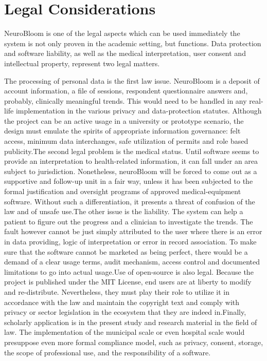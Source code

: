 \documentclass[12pt,a4paper]{report}
\begin{document}
\section{Legal Considerations}
NeuroBloom is one of the legal aspects which can be used immediately the system is not only proven in the academic setting, but functions. Data protection and software liability, as well as the medical interpretation, user consent and intellectual property, represent two legal matters.

The processing of personal data is the first law issue. NeuroBloom is a deposit of account information, a file of sessions, respondent questionnaire answers and, probably, clinically meaningful trends. This would need to be handled in any real-life implementation in the various privacy and data-protection statutes. Although the project can be an active usage in a university or prototype scenario, the design must emulate the spirits of appropriate information governance: felt access, minimum data interchanges, safe utilization of permits and role based publicity.The second legal problem is the medical status. Until software seems to provide an interpretation to health-related information, it can fall under an area subject to jurisdiction. Nonetheless, neuroBloom will be forced to come out as a supportive and follow-up unit in a fair way, unless it has been subjected to the formal justification and oversight programs of approved medical-equipment software. Without such a differentiation, it presents a threat of confusion of the law and of unsafe use.The other issue is the liability. The system can help a patient to figure out the progress and a clinician to investigate the trends. The fault however cannot be just simply attributed to the user where there is an error in data providing, logic of interpretation or error in record association. To make sure that the software cannot be marketed as being perfect, there would be a demand of a clear usage terms, audit mechanism, access control and documented limitations to go into actual usage.Use of open-source is also legal. Because the project is published under the MIT License, end users are at liberty to modify and re-distribute. Nevertheless, they must play their role to utilize it in accordance with the law and maintain the copyright text and comply with privacy or sector legislation in the ecosystem that they are indeed in.Finally, scholarly application is in the present study and research material in the field of law. The implementation of the municipal scale or even hospital scale would presuppose even more formal compliance model, such as privacy, consent, storage, the scope of professional use, and the responsibility of a software.
\end{document}
